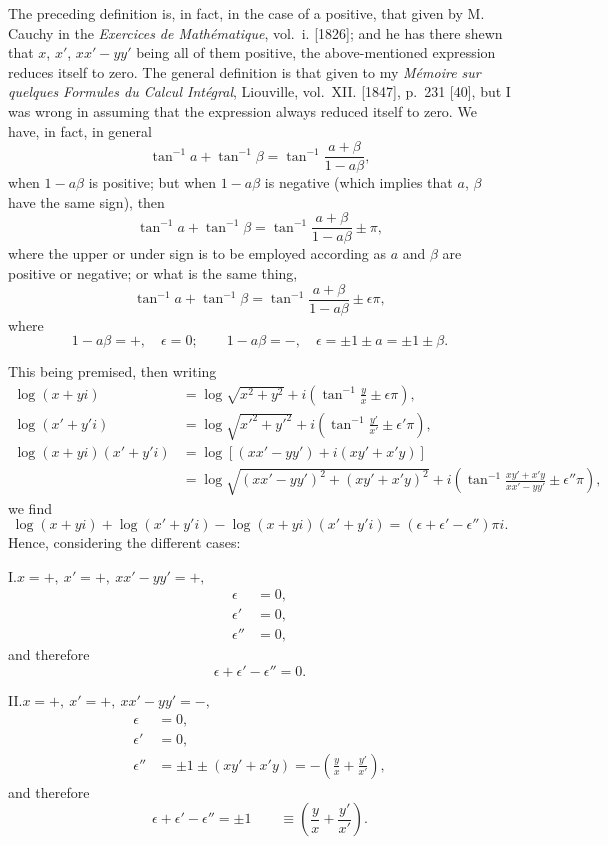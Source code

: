 \documentclass[12pt,a4paper]{article}
\theoremstyle{definition}
\begin{document}
The preceding definition is, in fact, in the case of a positive, that given by
M. Cauchy in the \textit{Exercices de Math\'ematique}, vol.~i. [1826]; and he has there shewn that
$x$, $x'$, $xx' - yy'$ being all of them positive, the above-mentioned expression reduces itself
to zero. The general definition is that given to my \textit{M\'emoire sur quelques Formules
du Calcul Int\'egral}, Liouville, vol.~XII. [1847], p.~231 [40], but I was wrong in assuming
that the expression always reduced itself to zero. We have, in fact, in general
\[
\tan^{-1}a + \tan^{-1}\beta = \tan^{-1}\frac{a+\beta}{1-a\beta},
\]
when $1 - a\beta$ is positive; but when $1 - a\beta$ is negative (which implies that $a$, $\beta$ have
the same sign), then
\[
\tan^{-1}a + \tan^{-1}\beta = \tan^{-1}\frac{a+\beta}{1-a\beta} \pm \pi,
\]
where the upper or under sign is to be employed according as $a$ and $\beta$ are positive
or negative; or what is the same thing,
\[
\tan^{-1}a + \tan^{-1}\beta = \tan^{-1}\frac{a+\beta}{1-a\beta} \pm \epsilon\pi,
\]
where
\[
1 - a\beta = +, \quad \epsilon = 0; \qquad 1 - a\beta = -, \quad \epsilon = \pm 1 \pm a = \pm 1 \pm \beta.
\]

\medskip

This being premised, then writing
\begin{align*}
\log(x+yi) &= \log\sqrt{x^2+y^2} + i\left(\tan^{-1}\frac{y}{x} \pm \epsilon\pi\right),\\
\log(x'+y'i) &= \log\sqrt{x'^2+y'^2} + i\left(\tan^{-1}\frac{y'}{x'} \pm \epsilon'\pi\right),\\
\log(x+yi)(x'+y'i) &= \log[(xx'-yy')+i(xy'+x'y)]\\
&= \log\sqrt{(xx'-yy')^2 + (xy'+x'y)^2} + i\left(\tan^{-1}\frac{xy'+x'y}{xx'-yy'} \pm \epsilon''\pi\right),
\end{align*}
we find
\[
\log(x+yi) + \log(x'+y'i) - \log(x+yi)(x'+y'i) = (\epsilon + \epsilon' - \epsilon'')\pi i.
\]
Hence, considering the different cases:

\medskip

\noindent I.\quad $x = +,\ x' = +,\ xx' - yy' = +,$
\begin{align*}
\epsilon &= 0,\\
\epsilon' &= 0,\\
\epsilon'' &= 0,
\end{align*}
and therefore
\[
\epsilon + \epsilon' - \epsilon'' = 0.
\]

\noindent II.\quad $x = +,\ x' = +,\ xx' - yy' = -,$
\begin{align*}
\epsilon &= 0,\\
\epsilon' &= 0,\\
\epsilon'' &= \pm 1 \pm (xy' + x'y) = -\left(\frac{y}{x} + \frac{y'}{x'}\right),
\end{align*}
and therefore
\[
\epsilon + \epsilon' - \epsilon'' = \pm 1 \qquad \equiv \left(\frac{y}{x} + \frac{y'}{x'}\right).
\]
\end{document}
